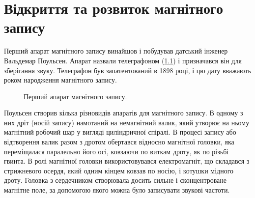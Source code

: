 \documentclass[a4paper,14pt]{extreport}
\begin{document}
\newpage

\chapter{Відкриття та розвиток магнітного запису}\par

  Перший апарат магнітного запису винайшов і побудував датський інженер Вальдемар Поульсен. Апарат назвали телеграфоном (\ref{ris2}) і призначався він для
  зберігання звуку. Телеграфон був запатентований в 1898 році\cite{lit1}, і цю дату вважають роком народження магнітного запису.\par
    \begin{figure}[h]
    \caption{Перший апарат магнітного запису.}
    \label{ris2}
  \end{figure}
  Поульсен створив кілька різновидів апаратів для магнітного запису. В одному з них дріт (носій запису) намотаний на немагнітний валик, який утворює на ньому магнітний робочий шар у вигляді циліндричної спіралі. В процесі запису або відтворення валик разом з дротом
  обертався відносно магнітної головки, яка переміщалася паралельно його осі, ковзаючи по виткам дроту, як по різьбі гвинта. В ролі магнітної головки використовувався електромагніт, що складався з стрижневого осердя, який одним кінцем ковзав по носію, і
  котушки мідного дроту. Головка з сердечником створювала досить сильне і сконцентроване магнітне поле, за допомогою якого можна було записувати звукові частоти.\par
\end{document}
